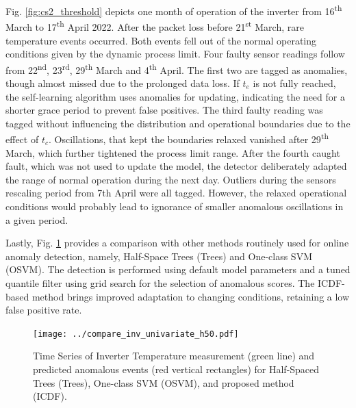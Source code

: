 Fig. \ref{fig:cs2_threshold} depicts one month of operation of the inverter from 16\textsuperscript{th} March to 17\textsuperscript{th} April 2022. After the packet loss before 21\textsuperscript{st} March, rare temperature events occurred. Both events fell out of the normal operating conditions given by the dynamic process limit. Four faulty sensor readings follow from 22\textsuperscript{nd}, 23\textsuperscript{rd}, 29\textsuperscript{th} March and 4\textsuperscript{th} April. The first two are tagged as anomalies, though almost missed due to the prolonged data loss. If $t_e$ is not fully reached, the self-learning algorithm uses anomalies for updating, indicating the need for a shorter grace period to prevent false positives. The third faulty reading was tagged without influencing the distribution and operational boundaries due to the effect of $t_c$. Oscillations, that kept the boundaries relaxed vanished after 29\textsuperscript{th} March, which further tightened the process limit range. After the fourth caught fault, which was not used to update the model, the detector deliberately adapted the range of normal operation during the next day. Outliers during the sensors rescaling period from 7th April were all tagged. However, the relaxed operational conditions would probably lead to ignorance of smaller anomalous oscillations in a given period.

Lastly, Fig. \ref{fig:comparison} provides a comparison with other methods routinely used for online anomaly detection, namely, Half-Space Trees (Trees) and One-class SVM (OSVM). The detection is performed using default model parameters and a tuned quantile filter using grid search for the selection of anomalous scores. The ICDF-based method brings improved adaptation to changing conditions, retaining a low false positive rate.
\begin{figure}[htbp]
 \centerline{\texttt{[image: ../compare\_inv\_univariate\_h50.pdf]}}
 \caption{Time Series of Inverter Temperature measurement (green line) and predicted anomalous events (red vertical rectangles) for Half-Spaced Trees (Trees), One-class SVM (OSVM), and proposed method (ICDF).}
 \label{fig:comparison}
\end{figure}